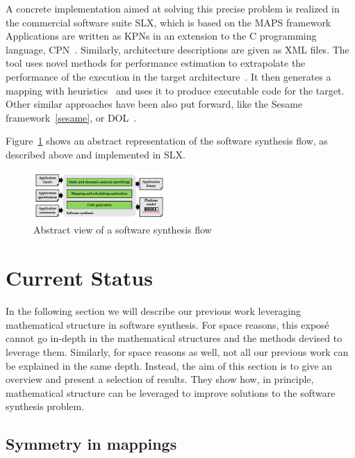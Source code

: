 \documentclass[sigplan,10pt]{acmart}
\begin{document}
A concrete implementation aimed at solving this precise problem is realized in the commercial software suite SLX, which is based on the MAPS framework~\cite{maps08,castrillon14_springer}
Applications are written as KPNs in an extension to the C programming language, CPN~\cite{sheng2014_cpn}. Similarly, architecture descriptions are given as XML files.
The tool uses novel methods for performance estimation to extrapolate the performance of the execution in the target architecture~\cite{TRETS_eusse14}.
It then generates a mapping with heuristics~\cite{castrillon2012,castrillon_industrial_informatics} and uses it to produce executable code for the target.
Other similar approaches have been also put forward, like the Sesame framework~\ref{sesame}, or DOL~\cite{thiele2007mapping}.

Figure~\ref{fig:synthesisflow} shows an abstract representation of the software synthesis flow, as described above and implemented in SLX.
\begin{figure}[h]
	\centering
	\includegraphics[width=0.45\textwidth]{figures/synthesisflow.pdf}
	\caption{Abstract view of a software synthesis flow}
	\label{fig:synthesisflow}
\end{figure}


\section{Current Status}
\label{sec:status}

In the following section we will describe our previous work leveraging mathematical structure in software synthesis.
For space reasons, this exposé cannot go in-depth in the mathematical structures and the methods devised to leverage them.
Similarly, for space reasons as well, not all our previous work can be explained in the same depth.
Instead, the aim of this section is to give an overview and present a selection of results.
They show how, in principle, mathematical structure can be leveraged to improve solutions to the software synthesis problem.

\subsection{Symmetry in mappings}\label{sec:symmetries}
\end{document}
